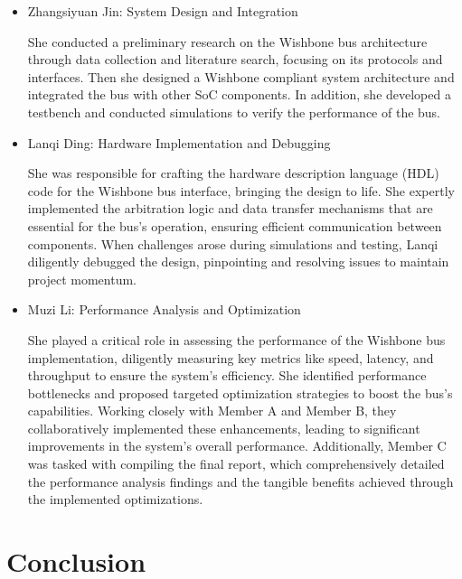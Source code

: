 \documentclass[conference]{IEEEtran}
\begin{document}
\begin{itemize}
    \item Zhangsiyuan Jin: System Design and Integration

    She conducted a preliminary research on the Wishbone bus architecture through data collection and literature search, focusing on its protocols and interfaces. Then she designed a Wishbone compliant system architecture and integrated the bus with other SoC components. In addition, she developed a testbench and conducted simulations to verify the performance of the bus.

    \item Lanqi Ding: Hardware Implementation and Debugging

    She was responsible for crafting the hardware description language (HDL) code for the Wishbone bus interface, bringing the design to life. She expertly implemented the arbitration logic and data transfer mechanisms that are essential for the bus's operation, ensuring efficient communication between components. When challenges arose during simulations and testing, Lanqi diligently debugged the design, pinpointing and resolving issues to maintain project momentum. 

    \item Muzi Li: Performance Analysis and Optimization

    She played a critical role in assessing the performance of the Wishbone bus implementation, diligently measuring key metrics like speed, latency, and throughput to ensure the system's efficiency. She identified performance bottlenecks and proposed targeted optimization strategies to boost the bus's capabilities. Working closely with Member A and Member B, they collaboratively implemented these enhancements, leading to significant improvements in the system's overall performance. Additionally, Member C was tasked with compiling the final report, which comprehensively detailed the performance analysis findings and the tangible benefits achieved through the implemented optimizations.

\end{itemize}


\section{Conclusion}










\printbibliography[title={References},resetnumbers=true,heading=subbibliography]
\clearpage
\end{document}

